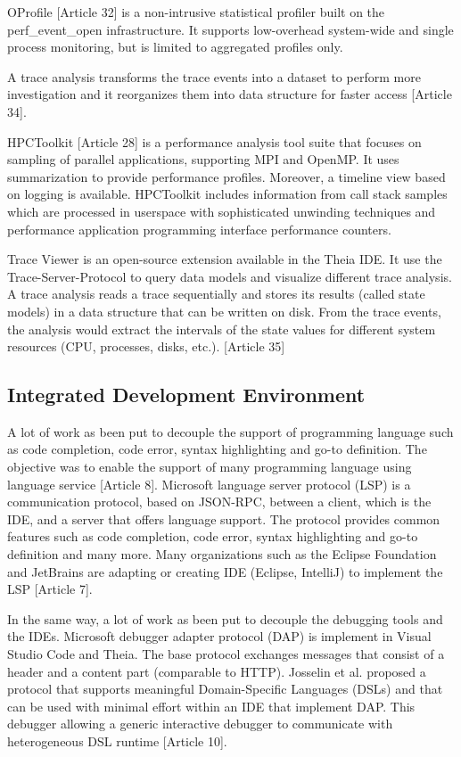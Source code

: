 OProfile [Article 32] is a non-intrusive statistical profiler built on the perf\_event\_open infrastructure. It supports low-overhead system-wide and single process monitoring, but is limited to aggregated profiles only.

A trace analysis transforms the trace events into a dataset to perform more investigation and it reorganizes them into data structure for faster access [Article 34].

HPCToolkit [Article 28] is a performance analysis tool suite that focuses on sampling of parallel applications, supporting MPI and OpenMP. It uses summarization to provide performance profiles. Moreover, a timeline view based on logging is available. HPCToolkit includes information from call stack samples which are processed in userspace with sophisticated unwinding techniques and performance application programming interface performance counters.

Trace Viewer is an open-source extension available in the Theia IDE. It use the Trace-Server-Protocol to query data models and visualize different trace analysis. A trace analysis reads a trace sequentially and stores its results (called state models) in a data structure that can be written on disk. From the trace events, the analysis would extract the intervals of the state values for different system resources (CPU, processes, disks, etc.). [Article 35]

\subsection{Integrated Development Environment}

A lot of work as been put to decouple the support of programming language such as code completion, code error, syntax highlighting and go-to definition. The objective was to enable the support of many programming language using language service [Article 8]. Microsoft language server protocol (LSP) is a communication protocol, based on JSON-RPC, between a client, which is the IDE, and a server that offers language support. The protocol provides common features such as code completion, code error, syntax highlighting and go-to definition and many more. Many organizations such as the Eclipse Foundation and JetBrains are adapting or creating IDE (Eclipse, IntelliJ) to implement the LSP [Article 7]. 

In the same way, a lot of work as been put to decouple the debugging tools and the IDEs. Microsoft debugger adapter protocol (DAP) is implement in Visual Studio Code and Theia. The base protocol exchanges messages that consist of a header and a content part (comparable to HTTP). Josselin et al. proposed a protocol that supports meaningful Domain-Specific Languages (DSLs) and that can be used with minimal effort within an IDE that implement DAP. This debugger allowing a generic interactive debugger to communicate with heterogeneous DSL runtime [Article 10]. 

